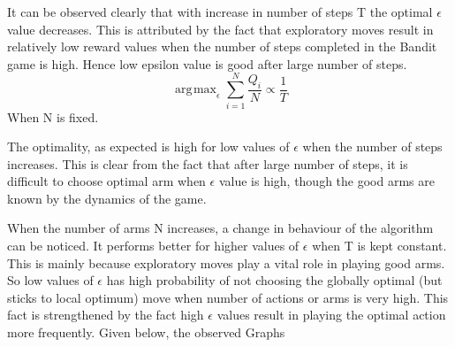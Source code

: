 \documentclass[a4paper,10pt]{report}
\DeclareMathOperator*{\argmax}{arg\!max}
\begin{document}
It can be observed clearly that with increase in number of steps T the optimal $\epsilon$ value decreases. This is attributed by the fact that exploratory moves result in relatively low reward values when the number of steps completed in the Bandit game is high. Hence low epsilon value is good after large number of steps.
\[ \argmax_{\epsilon} \displaystyle\sum_{i=1}^{N} \frac{Q_i}{N} \propto \frac{1}{T} \]
When N is fixed.

The optimality, as expected is high for low values of $\epsilon$ when the number of steps increases. This is clear from the fact that after large number of steps, it is difficult to choose optimal arm when $\epsilon$ value is high, though the good arms are known by the dynamics of the game.

When the number of arms N increases, a change in behaviour of the algorithm can be noticed. It performs better for higher values of $\epsilon$ when T is kept constant.
This is mainly because exploratory moves play a vital role in playing good arms. So low values of $\epsilon$ has high probability of not choosing the globally optimal (but sticks to local optimum) move when number of actions or arms is very high. This fact is strengthened by the fact high $\epsilon$ values result in playing the optimal action more frequently.
\pagebreak
Given below, the observed Graphs
\end{document}
